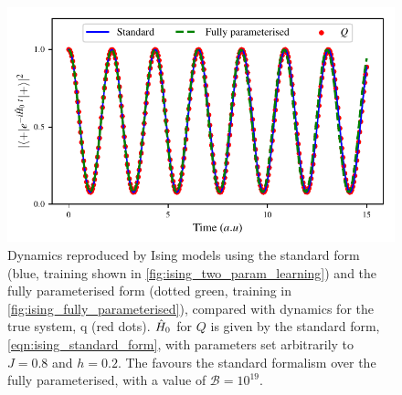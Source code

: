 \begin{figure}[t]
    \begin{center}
        \includegraphics{theoretical_study/figures/dynamics.pdf}
    \end{center}
    \caption[Ising model forms' dynamics]{
        Dynamics reproduced by Ising models using the standard form (blue, training shown in \cref{fig:ising_two_param_learning}) 
        and the fully parameterised form (dotted green, training in \cref{fig:ising_fully_parameterised}), 
        compared with dynamics for the true system, \gls{q} (red dots).
        $\hat{H}_0$ for $Q$ is given by the standard form, \cref{eqn:ising_standard_form}, with parameters set arbitrarily to $J=0.8$ and $h=0.2$.
        The  favours the standard formalism over the fully parameterised, with  a value of $\mathcal{B}=10^{19}$.
        \figtableref
    }
    \label{fig:ising_model_types_dynamics}
\end{figure}


